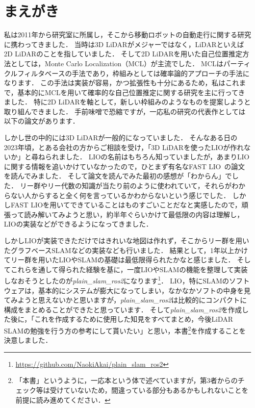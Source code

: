 \section*{まえがき}

私は2011年から研究室に所属し，そこから移動ロボットの自動走行に関する研究に携わってきました．
当時は3D LiDARがメジャーではなく，LiDARといえば2D LiDARのことを指していました．
そして2D LiDARを用いた自己位置推定方法としては，Monte Carlo Localization（MCL）\cite{DellaertICRA1999}が主流でした．
MCLはパーティクルフィルタベースの手法であり，枠組みとしては確率論的アプローチの手法になります．
この手法は実装が容易，かつ拡張性も十分にあるため，私はこれまで，基本的にMCLを用いて確率的な自己位置推定に関する研究を主に行ってきました．
特に2D LiDARを軸として，新しい枠組みのようなものを提案しようと取り組んできました．
手前味噌で恐縮ですが，一応私の研究の代表作としては以下の論文があります\cite{AkaiJFR2023}．

しかし世の中的には3D LiDARが一般的になっていました．
そんなある日の2023年頃，とある会社の方からご相談を受け，「3D LiDARを使ったLIOが作れないか」と尋ねられました．
LIOの名前はもちろん知っていましたが，あまりLIOに関する情報を追いかけていなかったので，ひとまず有名なFAST LIO~\cite{FAST-LIO}の論文を読んでみました．
そして論文を読んでみた最初の感想が「わからん」でした．
リー群やリー代数の知識が当たり前のように使われていて，それらがわからない人からすると全く何を言っているかわからないという感じでした．
しかしFAST LIOを用いてできていることはものすごいことだなと実感したので，頑張って読み解いてみようと思い，約半年ぐらいかけて最低限の内容は理解し，LIOの実装などができるようになってきました．

しかしLIOが実装できただけではきれいな地図は作れず，そこからリー群を用いたグラフベースSLAMなどの実装なども行いました．
結果として，1年以上かけてリー群を用いたLIOやSLAMの基礎は最低限得られたかなと感じました．
そしてこれらを通して得られた経験を基に，一度LIOやSLAMの機能を整理して実装しなおそうとしたのが{\it plain\_slam\_ros2}になります\footnote{ \url{https://github.com/NaokiAkai/plain_slam_ros2} }．
LIO，特にSLAMのソフトウェアは，基本的にシステムが膨大になってしまい，なかなかソフトの中身を見てみようと思えないかと思いますが，{\it plain\_slam\_ros2}は比較的にコンパクトに構成をまとめることができたと思っています．
そして{\it plain\_slam\_ros2}を作成した後に，「これを作成するために使用した知見をすべてまとめ，今後LiDAR SLAMの勉強を行う方の参考にして貰いたい」と思い，本書\footnote{ 「本書」というように，一応本という体で述べていますが，第3者からのチェック等は受けていないため，間違っている部分もあるかもしれないことを前提に読み進めてください． }を作成することを決意しました．

